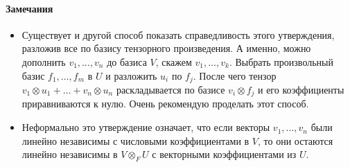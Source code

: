 \paragraph{Замечания}
\begin{itemize}
\item Существует и другой способ показать справедливость этого утверждения, разложив все по базису тензорного произведения. А именно, можно дополнить $v_1,\ldots,v_n$ до базиса $V$, скажем $v_1,\ldots, v_k$. Выбрать произвольный базис $f_1,\ldots,f_m$ в $U$ и разложить $u_i$ по $f_j$. После чего тензор $v_1\otimes u_1 + \ldots + v_n\otimes u_n$ раскладывается по базисе $v_i\otimes f_j$ и его коэффициенты приравниваются к нулю. Очень рекомендую проделать этот способ.

\item Неформально это утверждение означает, что если векторы $v_1,\ldots,v_n$ были линейно независимы с числовыми коэффициентами в $V$, то они остаются линейно независимы в $V\otimes_F U$ с векторными коэффициентами из $U$.
\end{itemize}
